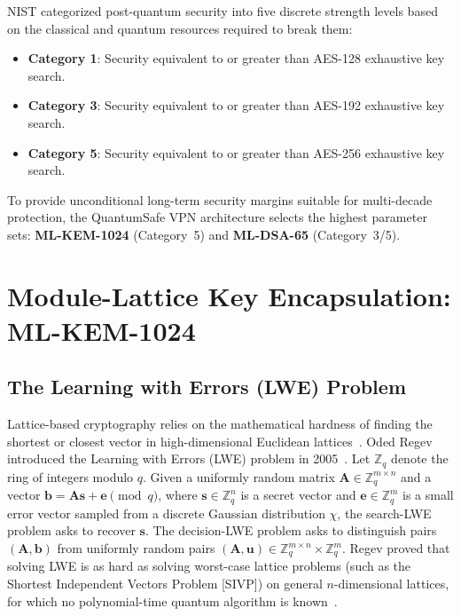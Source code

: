 NIST categorized post-quantum security into five discrete strength levels based on the classical and quantum resources required to break them:
\begin{itemize}
    \item \textbf{Category 1}: Security equivalent to or greater than AES-128 exhaustive key search.
    \item \textbf{Category 3}: Security equivalent to or greater than AES-192 exhaustive key search.
    \item \textbf{Category 5}: Security equivalent to or greater than AES-256 exhaustive key search.
\end{itemize}

To provide unconditional long-term security margins suitable for multi-decade protection, the QuantumSafe VPN architecture selects the highest parameter sets: \textbf{ML-KEM-1024} (Category~5) and \textbf{ML-DSA-65} (Category~3/5).

\section{Module-Lattice Key Encapsulation: ML-KEM-1024}
\label{sec:mlkem_foundations}

\subsection{The Learning with Errors (LWE) Problem}
Lattice-based cryptography relies on the mathematical hardness of finding the shortest or closest vector in high-dimensional Euclidean lattices~\cite{peikert2016decade}. Oded Regev introduced the Learning with Errors (LWE) problem in 2005~\cite{regev2009lattices}. Let $\mathbb{Z}_q$ denote the ring of integers modulo $q$. Given a uniformly random matrix $\mathbf{A} \in \mathbb{Z}_q^{m \times n}$ and a vector $\mathbf{b} = \mathbf{A}\mathbf{s} + \mathbf{e} \pmod q$, where $\mathbf{s} \in \mathbb{Z}_q^n$ is a secret vector and $\mathbf{e} \in \mathbb{Z}_q^m$ is a small error vector sampled from a discrete Gaussian distribution $\chi$, the search-LWE problem asks to recover $\mathbf{s}$. The decision-LWE problem asks to distinguish pairs $(\mathbf{A}, \mathbf{b})$ from uniformly random pairs $(\mathbf{A}, \mathbf{u}) \in \mathbb{Z}_q^{m \times n} \times \mathbb{Z}_q^m$. Regev proved that solving LWE is as hard as solving worst-case lattice problems (such as the Shortest Independent Vectors Problem [SIVP]) on general $n$-dimensional lattices, for which no polynomial-time quantum algorithm is known~\cite{albrecht2016hardness}.

